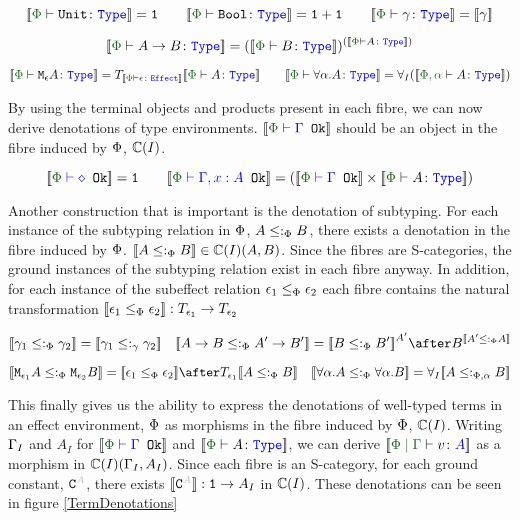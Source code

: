 \documentclass{Report}
\begin{document}
\[
    \deno{\typerelation{\P}{\U}{\type}} = \1
    \quad\quad
    \deno{\typerelation{\P}{\B}{\type}} = \1+\1
    \quad\quad
    \deno{\typerelation{\P}{\g}{\type}} = \deno{\g}
\] 

\[
    \deno{\typerelation{\P}{\ab}{\type}} = (\deno{\typerelation{\P}{B}{\type}})^{(\deno{\typerelation{\P}{A}{\type}})}
\]

\[
    \deno{\typerelation{\P}{\mea}{\type}} =\T{\deno{\typerelation{\P}{\e}{\effect}}}{\deno{\typerelation{\P}{A}{\type}}}
    \quad\quad
    \deno{\typerelation{\P}{\all{\a}{A}}{\type}} =\allI(\deno{\typerelation{\P,\a}{A}{\type}})
\]


By using the terminal objects and products present in each fibre, we can now derive denotations of type environments. $\deno{\oke{\P}{\G}}$ should be an object in the fibre induced by $\P$, $\C(I)$.

\[
    \deno{\wellformedok{\P}{\nil}} = \1
    \quad\quad
    \deno{\wellformedok{\P}{\gax}} = (\deno{\wellformedok{\P}{\G}} \times \deno{\typerelation{\P}{A}{\type}})
\]

Another construction that is important is the denotation of subtyping. For each instance of the subtyping relation in $\P$, $A\subtypep B$, there exists a denotation in the fibre induced by $\P$. $\deno{A\subtypep B} \in\C(I)(A, B)$. Since the fibres are S-categories, the ground instances of the subtyping relation exist in each fibre anyway. In addition, for each instance of the subeffect relation $\e_1\subeffectp \e_2$ each fibre contains the natural transformation $\dsep{\e_1}{\e_2}: \T{\e_1}{}\rightarrow \T{\e_2}{}$ 

\[
    \deno{\g_1\subtypep \g_2} = \deno{\g_1\subtypeg \g_2}
    \quad
    \deno{\ab \subtypep \fntype{A'}{B'}} = \deno{B\subtypep B'}^{A'}\after B^{\deno{A'\subtypep A}}
\]

\[
    \deno{\M{\e_1}{A}\subtypep\M{\e_2}{B}} = \deno{\e_1\subeffectp\e_2}\after\T{\e_1}{\deno{A\subtypep B}}
    \quad    
    \deno{\all{\a}{A}\subtypep\all{\a}{B}} = \allI{\deno{A\subtypepa B}}
\]

This finally gives us the ability to express the denotations of well-typed terms in an effect environment, $\P$ as morphisms in the fibre induced by $\P$, $\C(I)$.  Writing $\G_I$ and $A_I$ for $\deno{\wellformedok{\P}{\G}}$ and $\deno{\typerelation{\P}{A}{\type}}$, we can derive $\deno{\gpetyperelation{v}{A}}$ as a morphism in $\C(I)(\G_I, A_I)$. Since each fibre is an S-category, for each ground constant, $\const{A}$, there exists $\deno{\const{A}}: \1 \rightarrow A_I$ in $\C(I)$. These denotations can be seen in figure \ref{TermDenotations}
\end{document}
